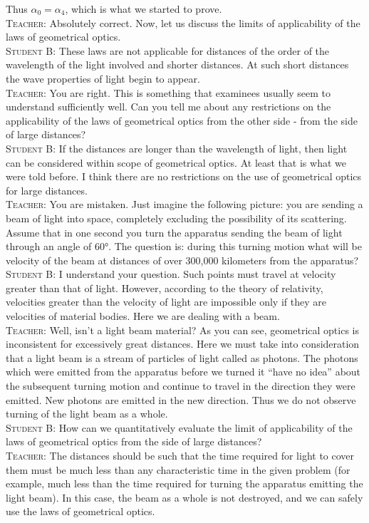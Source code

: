 \documentclass[a4paper,sfsidenotes]{tufte-book}
\begin{document}
Thus $\alpha_{0} = \alpha_{4}$, which is what we started to prove.
\\
\textsc{Teacher:} Absolutely correct. Now, let us discuss the limits of applicability of the laws of geometrical optics.
\\
\textsc{Student B:} These laws are not applicable for distances of the order of the wavelength of the light involved and shorter distances. At such short distances the wave properties of light begin to appear.
\\
\textsc{Teacher:} You are right. This is something that examinees usually seem to understand sufficiently well. Can you tell me about any restrictions on the applicability of the laws of geometrical optics from the other side - from the side of large distances?
\\
\textsc{Student B:} If the distances are longer than the wavelength of light, then light can be considered within scope of geometrical optics. At least that is what we were told before. I think there are no restrictions on the use of geometrical optics for large distances.
\\
\textsc{Teacher:} You are mistaken. Just imagine the following picture: you are sending a beam of light into space, completely excluding the possibility of its scattering. Assume that in one second you turn the apparatus sending the beam of light through an angle of \ang{60}. The question is: during this turning motion what will be velocity of the beam at distances of over 300,000 kilometers from the apparatus?
\\
\textsc{Student B:} I understand your question. Such points must travel at velocity greater than that of light. However, according to the theory of relativity, velocities greater than the velocity of light are impossible only if they are velocities of material bodies. Here we are dealing with a beam.
\\
\textsc{Teacher:} Well, isn't a light beam material? As you can see, geometrical optics is inconsistent for excessively great distances. Here we must take into consideration that a light beam is a stream of particles of light called as photons. The photons which were emitted from the apparatus before we turned it ``have no idea'' about the subsequent turning motion and continue to travel in the direction they were emitted. New photons are emitted in the new direction. Thus we do not observe turning of the light beam as a whole. 
\\
\textsc{Student B:} How can we quantitatively evaluate the limit of applicability of the laws of geometrical optics from the side of large distances?
\\
\textsc{Teacher:} The distances should be such that the time required for light to cover them must be much less than any characteristic time in the given problem (for example, much less than the time required for turning the apparatus emitting the light beam). In this case, the beam as a whole is not destroyed, and we can safely use the laws of geometrical optics.
\end{document}
